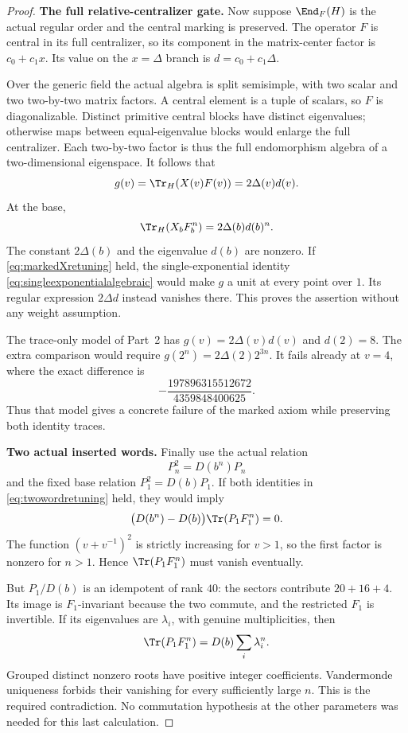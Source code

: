 \documentclass[11pt,a4paper]{article}
\theoremstyle{named}\newtheorem{finding}{Finding}[section]
\theoremstyle{definition}\newtheorem{definition}[finding]{Definition}
\theoremstyle{remark}\newtheorem{remark}[finding]{Remark}
\begin{document}
\begin{proof}
\par\smallskip\noindent\textbf{The full relative-centralizer gate.}\quad
Now suppose $\End_F(H)$ is the actual regular order
and the central marking is preserved.
The operator $F$ is central in its full centralizer,
so its component in the matrix-center factor is
$c_0+c_1x$.
Its value on the $x=\Delta$ branch is
$d=c_0+c_1\Delta$.

Over the generic field the actual algebra is split
semisimple, with two scalar and two two-by-two matrix
factors.
A central element is a tuple of scalars, so $F$ is
diagonalizable.
Distinct primitive central blocks have distinct eigenvalues;
otherwise maps between equal-eigenvalue blocks would
enlarge the full centralizer.
Each two-by-two factor is thus the full endomorphism
algebra of a two-dimensional eigenspace.
It follows that
\[
 g(v)=\Tr_H(X(v)F(v))=2\Delta(v)d(v).
\]
At the base,
\[
 \Tr_H(X_bF_b^n)=2\Delta(b)d(b)^n.
\]
The constant $2\Delta(b)$ and the eigenvalue $d(b)$
are nonzero.
If \eqref{eq:markedXretuning} held, the single-exponential
identity \eqref{eq:singleexponentialalgebraic} would make
$g$ a unit at every point over $1$.
Its regular expression $2\Delta d$ instead vanishes there.
This proves the assertion without any weight assumption.

The trace-only model of Part~2 has
$g(v)=2\Delta(v)d(v)$ and $d(2)=8$.
The extra comparison would require
$g(2^n)=2\Delta(2)2^{3n}$.
It fails already at $v=4$, where the exact difference is
\[
 -\frac{197896315512672}{4359848400625}.
\]
Thus that model gives a concrete failure of the marked
axiom while preserving both identity traces.

\par\smallskip\noindent\textbf{Two actual inserted words.}\quad
Finally use the actual relation
\[
 P_n^2=D(b^n)P_n
\]
and the fixed base relation $P_1^2=D(b)P_1$.
If both identities in \eqref{eq:twowordretuning} held,
they would imply
\[
 \bigl(D(b^n)-D(b)\bigr)\Tr(P_1F_1^n)=0.
\]
The function $(v+v^{-1})^2$ is strictly increasing
for $v>1$, so the first factor is nonzero for $n>1$.
Hence $\Tr(P_1F_1^n)$ must vanish eventually.

But $P_1/D(b)$ is an idempotent of rank $40$:
the sectors contribute $20+16+4$.
Its image is $F_1$-invariant because the two commute,
and the restricted $F_1$ is invertible.
If its eigenvalues are $\lambda_i$, with genuine
multiplicities, then
\[
 \Tr(P_1F_1^n)=D(b)\sum_i\lambda_i^n.
\]
Grouped distinct nonzero roots have positive integer
coefficients.
Vandermonde uniqueness forbids their vanishing for
every sufficiently large $n$.
This is the required contradiction.
No commutation hypothesis at the other parameters
was needed for this last calculation.
\end{proof}
\end{document}
